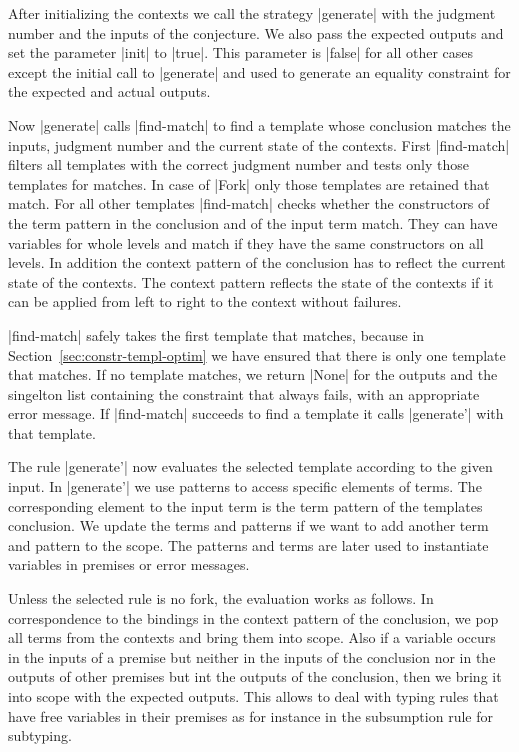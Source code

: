 After initializing the contexts we call the strategy \code|generate|
with the judgment number and the inputs of the conjecture. We also
pass the expected outputs and set the parameter \code|init| to
\code|true|. This parameter is \code|false| for all other cases except
the initial call to \code|generate| and used to generate an equality
constraint for the expected and actual outputs.

Now \code|generate| calls \code|find-match| to find a template whose
conclusion matches the inputs, judgment number and the current state
of the contexts. First \code|find-match| filters all templates with
the correct judgment number and tests only those templates for
matches.  In case of
\code|Fork| only those templates are retained that match. For all
other templates \code|find-match| checks whether the constructors of
the term pattern in the conclusion and of the input term match. They
can have variables for whole levels and match if they have the same
constructors on all levels. In addition the context pattern of the
conclusion has to reflect the current state of the contexts. The
context pattern reflects the state of the contexts if it can be
applied from left to right to the context without failures.

\code|find-match| safely takes the first template that matches,
because in Section~\ref{sec:constr-templ-optim} we have ensured that
there is only one template that matches. If no template matches, we
return \code|None| for the outputs and the singelton list containing
the constraint that always fails, with an appropriate error
message. If \code|find-match| succeeds to find a template it calls
\code|generate'| with that template.

The rule \code|generate'| now evaluates the selected template
according to the given input. In \code|generate'| we use patterns to
access specific elements of terms. The corresponding element to the
input term is the term pattern of the templates conclusion. We update
the terms and patterns if we want to add another term and pattern to
the scope. The patterns and terms are later used to instantiate
variables in premises or error messages.

Unless the selected rule is no fork, the evaluation works as
follows. In correspondence to the bindings in the context pattern of
the conclusion, we pop all terms from the contexts and bring them into
scope. Also if a variable occurs in the inputs of a premise but
neither in the inputs of the conclusion nor in the outputs of other
premises but int the outputs of the conclusion, then we bring it into
scope with the expected outputs.  This
allows to deal with typing rules that have free variables in their
premises as for instance in the subsumption rule for subtyping.

